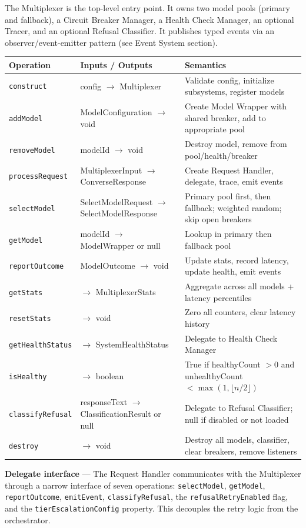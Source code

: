\documentclass[10pt,letterpaper]{article}
\newcommand{\fn}[1]{\texttt{#1}}
\newcommand{\fld}[1]{\texttt{#1}}
\begin{document}
The Multiplexer is the top-level entry point. It owns two model pools (primary and fallback), a Circuit Breaker Manager, a Health Check Manager, an optional Tracer, and an optional Refusal Classifier. It publishes typed events via an observer/event-emitter pattern (see Event System section).

\smallskip
\begin{tabular}{@{}l l p{6.5cm}@{}}
\toprule
\textbf{Operation} & \textbf{Inputs / Outputs} & \textbf{Semantics} \\
\midrule
\fn{construct} & config $\to$ Multiplexer & Validate config, initialize subsystems, register models \\
\fn{addModel} & ModelConfiguration $\to$ void & Create Model Wrapper with shared breaker, add to appropriate pool \\
\fn{removeModel} & modelId $\to$ void & Destroy model, remove from pool/health/breaker \\
\fn{processRequest} & MultiplexerInput $\to$ ConverseResponse & Create Request Handler, delegate, trace, emit events \\
\fn{selectModel} & SelectModelRequest $\to$ SelectModelResponse & Primary pool first, then fallback; weighted random; skip open breakers \\
\fn{getModel} & modelId $\to$ ModelWrapper or null & Lookup in primary then fallback pool \\
\fn{reportOutcome} & ModelOutcome $\to$ void & Update stats, record latency, update health, emit events \\
\fn{getStats} & $\to$ MultiplexerStats & Aggregate across all models + latency percentiles \\
\fn{resetStats} & $\to$ void & Zero all counters, clear latency history \\
\fn{getHealthStatus} & $\to$ SystemHealthStatus & Delegate to Health Check Manager \\
\fn{isHealthy} & $\to$ boolean & True if healthyCount $> 0$ and unhealthyCount $< \max(1, \lfloor n/2 \rfloor)$ \\
\fn{classifyRefusal} & responseText $\to$ ClassificationResult or null & Delegate to Refusal Classifier; null if disabled or not loaded \\
\fn{destroy} & $\to$ void & Destroy all models, classifier, clear breakers, remove listeners \\
\bottomrule
\end{tabular}

\medskip
\noindent\textbf{Delegate interface} --- The Request Handler communicates with the Multiplexer through a narrow interface of seven operations: \fn{selectModel}, \fn{getModel}, \fn{reportOutcome}, \fn{emitEvent}, \fn{classifyRefusal}, the \fld{refusalRetryEnabled} flag, and the \fld{tierEscalationConfig} property. This decouples the retry logic from the orchestrator.
\end{document}
